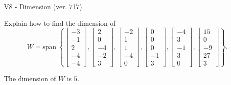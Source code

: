 \begin{exercise}
  \begin{exerciseTitle}V8 - Dimension (ver. 717)\end{exerciseTitle}
  \begin{exerciseStatement}
    Explain how to find the dimension of 
\[W=\mathrm{span}\ \left\{\left[\begin{array}{r}
-3 \\
-1 \\
2 \\
-4 \\
-4
\end{array}\right] , \left[\begin{array}{r}
2 \\
0 \\
-4 \\
-2 \\
3
\end{array}\right] , \left[\begin{array}{r}
-2 \\
1 \\
1 \\
-4 \\
0
\end{array}\right] , \left[\begin{array}{r}
0 \\
0 \\
0 \\
-1 \\
3
\end{array}\right] , \left[\begin{array}{r}
-4 \\
3 \\
-1 \\
3 \\
0
\end{array}\right] , \left[\begin{array}{r}
15 \\
0 \\
-9 \\
27 \\
3
\end{array}\right]\right\}.\]



  \end{exerciseStatement}
  \begin{exerciseAnswer}
   The dimension of \(W\) is  \(5\).
  


  \end{exerciseAnswer}
\end{exercise}